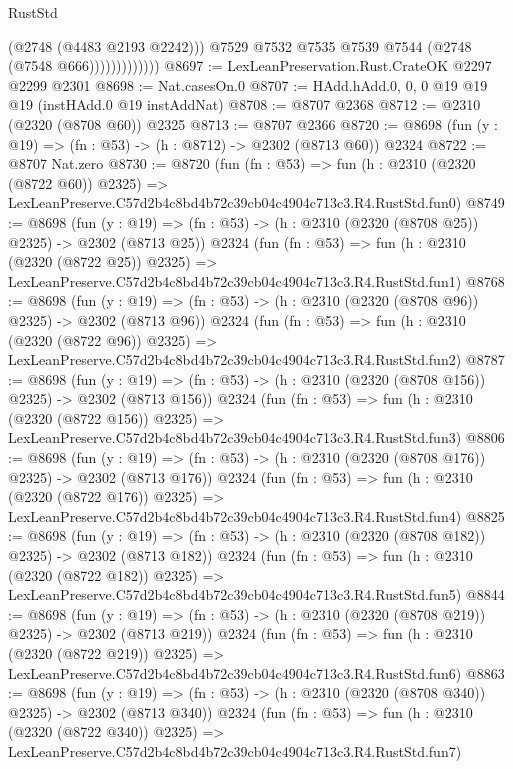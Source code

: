 \begin{lexlean}{RustStd}
\begin{coremodule}
                            (@2748 (@4483 @2193 @2242)))
                          @7529
                          @7532
                          @7535
                          @7539
                          @7544
                          (@2748 (@7548 @666)))))))))))))
@8697 := LexLeanPreservation.Rust.CrateOK @2297 @2299 @2301
@8698 := Nat.casesOn.{0}
@8707 := HAdd.hAdd.{0, 0, 0} @19 @19 @19 (instHAdd.{0} @19 instAddNat)
@8708 := @8707 @2368
@8712 := @2310 (@2320 (@8708 @60)) @2325
@8713 := @8707 @2366
@8720 := @8698 (fun (y : @19) => (fn : @53) -> (h : @8712) -> @2302 (@8713 @60)) @2324
@8722 := @8707 Nat.zero
@8730 := @8720
    (fun (fn : @53) =>
    fun (h : @2310 (@2320 (@8722 @60)) @2325) =>
    LexLeanPreserve.C57d2b4c8bd4b72c39cb04c4904c713c3.R4.RustStd.fun0)
@8749 := @8698
    (fun (y : @19) => (fn : @53) -> (h : @2310 (@2320 (@8708 @25)) @2325) -> @2302 (@8713 @25))
    @2324
    (fun (fn : @53) =>
    fun (h : @2310 (@2320 (@8722 @25)) @2325) =>
    LexLeanPreserve.C57d2b4c8bd4b72c39cb04c4904c713c3.R4.RustStd.fun1)
@8768 := @8698
    (fun (y : @19) => (fn : @53) -> (h : @2310 (@2320 (@8708 @96)) @2325) -> @2302 (@8713 @96))
    @2324
    (fun (fn : @53) =>
    fun (h : @2310 (@2320 (@8722 @96)) @2325) =>
    LexLeanPreserve.C57d2b4c8bd4b72c39cb04c4904c713c3.R4.RustStd.fun2)
@8787 := @8698
    (fun (y : @19) => (fn : @53) -> (h : @2310 (@2320 (@8708 @156)) @2325) -> @2302 (@8713 @156))
    @2324
    (fun (fn : @53) =>
    fun (h : @2310 (@2320 (@8722 @156)) @2325) =>
    LexLeanPreserve.C57d2b4c8bd4b72c39cb04c4904c713c3.R4.RustStd.fun3)
@8806 := @8698
    (fun (y : @19) => (fn : @53) -> (h : @2310 (@2320 (@8708 @176)) @2325) -> @2302 (@8713 @176))
    @2324
    (fun (fn : @53) =>
    fun (h : @2310 (@2320 (@8722 @176)) @2325) =>
    LexLeanPreserve.C57d2b4c8bd4b72c39cb04c4904c713c3.R4.RustStd.fun4)
@8825 := @8698
    (fun (y : @19) => (fn : @53) -> (h : @2310 (@2320 (@8708 @182)) @2325) -> @2302 (@8713 @182))
    @2324
    (fun (fn : @53) =>
    fun (h : @2310 (@2320 (@8722 @182)) @2325) =>
    LexLeanPreserve.C57d2b4c8bd4b72c39cb04c4904c713c3.R4.RustStd.fun5)
@8844 := @8698
    (fun (y : @19) => (fn : @53) -> (h : @2310 (@2320 (@8708 @219)) @2325) -> @2302 (@8713 @219))
    @2324
    (fun (fn : @53) =>
    fun (h : @2310 (@2320 (@8722 @219)) @2325) =>
    LexLeanPreserve.C57d2b4c8bd4b72c39cb04c4904c713c3.R4.RustStd.fun6)
@8863 := @8698
    (fun (y : @19) => (fn : @53) -> (h : @2310 (@2320 (@8708 @340)) @2325) -> @2302 (@8713 @340))
    @2324
    (fun (fn : @53) =>
    fun (h : @2310 (@2320 (@8722 @340)) @2325) =>
    LexLeanPreserve.C57d2b4c8bd4b72c39cb04c4904c713c3.R4.RustStd.fun7)

\end{coremodule}
\end{lexlean}
